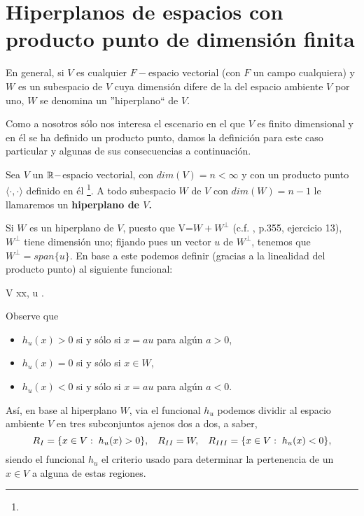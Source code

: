 \section{Hiperplanos de espacios con producto punto de dimensión finita}
\label{section: hiperplanos}
En general, si $V$ es cualquier $F-$espacio vectorial (con $F$
un campo cualquiera) y $W$ es un subespacio de $V$
cuya dimensión difere de la del espacio ambiente $V$
por uno, $W$ se denomina un ''hiperplano`` de $V$.

Como a nosotros sólo nos interesa el escenario
en el que $V$ es finito dimensional y 
en él se ha definido un producto punto, damos la
definición para este caso
particular y algunas de sus consecuencias a continuación.

\begin{defi}
Sea $V$ un $\mathbb{R}-$espacio vectorial,
con $dim(V)=n < \infty$ y con un producto punto $\langle \cdot, \cdot \rangle$
definido en él \footnote{}. A todo subespacio
$W$ de $V$ con $dim(W)=n-1$ le llamaremos un
\textbf{hiperplano de $V$.}
\end{defi}



Si $W$ es un hiperplano de $V$, puesto que
V=$W + W^{\perp}$
(c.f. \cite{friedberg}, p.355, ejercicio 13),
$W^{\perp}$ tiene dimensión uno; fijando pues un
vector $u$ de $W^{\perp}$, tenemos que
$W^{\perp}=span\{ u\}$. En base a este 
podemos definir (gracias a la linealidad
del producto punto) al siguiente funcional:

\begin{center}
{V}
{\IR }
{x}{\langle x, u \rangle.}
\end{center}
Observe que
\begin{itemize}
\item $h_{u}(x)>0$ si y sólo si $x= a u$ para algún $a>0$,
\item $h_{u}(x)=0$ si y sólo si $x \in W$,
\item $h_{u}(x)<0$ si y sólo si $x= a u$ para algún $a<0$.
\end{itemize}
Así, en base al hiperplano $W$, via
el funcional $h_{u}$ podemos dividir
al espacio ambiente $V$ en tres subconjuntos ajenos
dos a dos, a saber, 
\begin{equation}
\label{eq1: 29Nov}
R_{I}= \{ x \in V: \hspace{0.1cm} h_{u}(x)> 0 \},
\hspace{0.3cm}
R_{II}=W, 
\hspace{0.3cm}
R_{III}= \{ x \in V: \hspace{0.1cm} h_{u}(x)<0 \},
\end{equation}
siendo el funcional $h_{u}$ el criterio usado para
determinar la pertenencia de un $x \in V$ a alguna de estas regiones.

